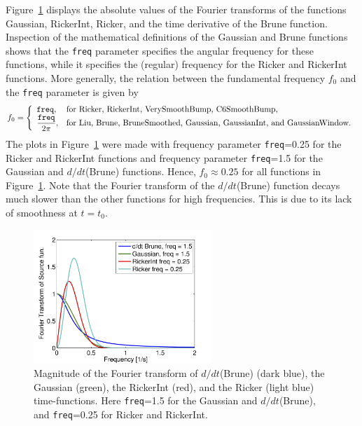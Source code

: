 \documentclass[11pt]{report}
\begin{document}
Figure~\ref{fig:fouriers} displays the absolute values of the Fourier transforms of the functions
Gaussian, RickerInt, Ricker, and the time derivative of the Brune function. Inspection of the
mathematical definitions of the Gaussian and Brune functions shows that the {\tt freq} parameter
specifies the angular frequency for these functions, while it specifies the (regular) frequency for
the Ricker and RickerInt functions. More generally, the relation between the fundamental frequency
$f_0$ and the {\tt freq} parameter is given by
\begin{equation}\label{eq:angular-scaling}
f_0 = \left\{ \begin{array}{ll}
 {\tt freq},& \mbox{for Ricker, RickerInt, VerySmoothBump, C6SmoothBump},\\
 \dfrac{\tt freq}{2\pi},& \mbox{for Liu, Brune, BruneSmoothed, Gaussian, GaussianInt, and GaussianWindow}.
\end{array}\right.
\end{equation}
The plots in Figure~\ref{fig:fouriers} were made with frequency parameter {\tt freq}=0.25 for the
Ricker and RickerInt functions and frequency parameter {\tt freq}=1.5 for the Gaussian and
$d/dt$(Brune) functions. Hence, $f_0\approx 0.25$ for all functions in
Figure~\ref{fig:fouriers}. Note that the Fourier transform of the $d/dt$(Brune) function decays much slower
than the other functions for high frequencies. This is due to its lack of smoothness at $t=t_0$.
\begin{figure}
\begin{center}
\includegraphics[width=0.6\textwidth]{figures/figfouriers.png}
\caption{ Magnitude of the Fourier transform of $d/dt$(Brune) (dark blue), the Gaussian (green), the
  RickerInt (red), and the Ricker (light blue) time-functions. Here {\tt freq}=1.5 for the Gaussian
  and $d/dt$(Brune), and {\tt freq}=0.25 for Ricker and RickerInt.}
\label{fig:fouriers}
\end{center}
\end{figure}
\end{document}
